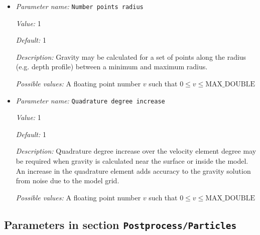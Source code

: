 \begin{itemize}
{\it Description:} Gravity may be calculated for a sets of points along the longitude (e.g. gravity map) between a minimum and maximum longitude.


{\it Possible values:} A floating point number $v$ such that $0 \leq v \leq \text{MAX\_DOUBLE}$
\item {\it Parameter name:} {\tt Number points radius}
\label{parameters:Postprocess/Gravity calculation/Number points radius}


{\it Value:} 1


{\it Default:} 1


{\it Description:} Gravity may be calculated for a set of points along the radius (e.g. depth profile) between a minimum and maximum radius.


{\it Possible values:} A floating point number $v$ such that $0 \leq v \leq \text{MAX\_DOUBLE}$
\item {\it Parameter name:} {\tt Quadrature degree increase}
\label{parameters:Postprocess/Gravity calculation/Quadrature degree increase}


{\it Value:} 1


{\it Default:} 1


{\it Description:} Quadrature degree increase over the velocity element degree may be required when gravity is calculated near the surface or inside the model. An increase in the quadrature element adds accuracy to the gravity solution from noise due to the model grid.


{\it Possible values:} A floating point number $v$ such that $0 \leq v \leq \text{MAX\_DOUBLE}$
\end{itemize}

\subsection{Parameters in section \tt Postprocess/Particles}
\label{parameters:Postprocess/Particles}

